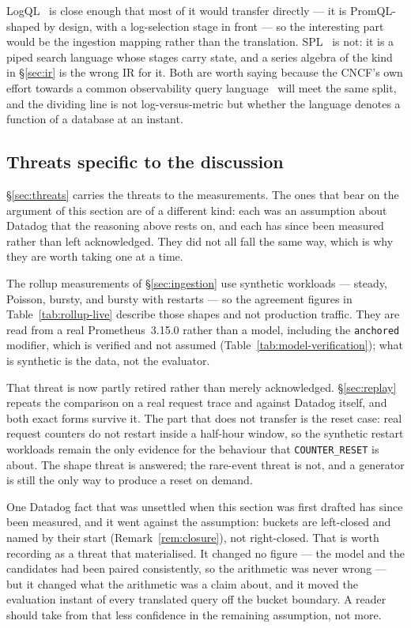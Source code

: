 LogQL~\citep{logql} is close enough that most of it would transfer directly --- it is
PromQL-shaped by design, with a log-selection stage in front --- so the interesting part
would be the ingestion mapping rather than the translation. SPL~\citep{splunk} is not:
it is a piped search language whose stages carry state, and a series algebra of the kind
in \S\ref{sec:ir} is the wrong IR for it. Both are worth saying because the CNCF's own
effort towards a common observability query language~\citep{sharma2025} will meet the
same split, and the dividing line is not log-versus-metric but whether the language
denotes a function of a database at an instant.

\subsection{Threats specific to the discussion}

\S\ref{sec:threats} carries the threats to the measurements. The ones that bear on the
argument of this section are of a different kind: each was an assumption about Datadog
that the reasoning above rests on, and each has since been measured rather than left
acknowledged. They did not all fall the same way, which is why they are worth taking one
at a time.

The rollup measurements of \S\ref{sec:ingestion} use synthetic workloads --- steady,
Poisson, bursty, and bursty with restarts --- so the agreement figures in
Table~\ref{tab:rollup-live} describe those shapes and not production traffic. They are
read from a real Prometheus~3.15.0 rather than a model, including the \texttt{anchored}
modifier, which is verified and not assumed (Table~\ref{tab:model-verification}); what is
synthetic is the data, not the evaluator.

That threat is now partly retired rather than merely acknowledged.
\S\ref{sec:replay} repeats the comparison on a real request trace and against Datadog
itself, and both exact forms survive it. The part that does not transfer is the reset
case: real request counters do not restart inside a half-hour window, so the synthetic
restart workloads remain the only evidence for the behaviour that
\texttt{COUNTER\_RESET} is about. The shape threat is answered; the rare-event threat is
not, and a generator is still the only way to produce a reset on demand.

One Datadog fact that was unsettled when this section was first drafted has since been
measured, and it went against the assumption: buckets are left-closed and named by their
start (Remark~\ref{rem:closure}), not right-closed. That is worth recording as a threat
that materialised. It changed no figure --- the model and the candidates had been paired
consistently, so the arithmetic was never wrong --- but it changed what the arithmetic was
a claim about, and it moved the evaluation instant of every translated query off the
bucket boundary. A reader should take from that less confidence in the remaining
assumption, not more.

